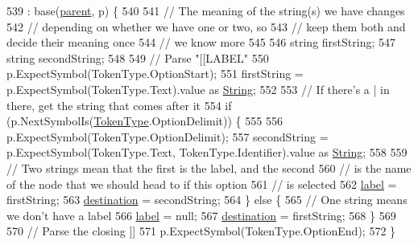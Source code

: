 \begin{DoxyCode}
539                                                                  : base(\hyperlink{a00122_af313a82103fcc2ff5a177dbb06b92f7b}{parent}, p) \{
540 
541                 \textcolor{comment}{// The meaning of the string(s) we have changes}
542                 \textcolor{comment}{// depending on whether we have one or two, so}
543                 \textcolor{comment}{// keep them both and decide their meaning once}
544                 \textcolor{comment}{// we know more}
545 
546                 \textcolor{keywordtype}{string} firstString;
547                 \textcolor{keywordtype}{string} secondString;
548 
549                 \textcolor{comment}{// Parse "[[LABEL"}
550                 p.ExpectSymbol(TokenType.OptionStart);
551                 firstString = p.ExpectSymbol(TokenType.Text).value as \hyperlink{a00031_a301aa7c866593a5b625a8fc158bbeacea27118326006d3829667a400ad23d5d98}{String};
552 
553                 \textcolor{comment}{// If there's a | in there, get the string that comes after it}
554                 \textcolor{keywordflow}{if} (p.NextSymbolIs(\hyperlink{a00031_a301aa7c866593a5b625a8fc158bbeace}{TokenType}.OptionDelimit)) \{
555 
556                     p.ExpectSymbol(TokenType.OptionDelimit);
557                     secondString = p.ExpectSymbol(TokenType.Text, TokenType.Identifier).value as 
      \hyperlink{a00031_a301aa7c866593a5b625a8fc158bbeacea27118326006d3829667a400ad23d5d98}{String};
558 
559                     \textcolor{comment}{// Two strings mean that the first is the label, and the second}
560                     \textcolor{comment}{// is the name of the node that we should head to if this option}
561                     \textcolor{comment}{// is selected}
562                     \hyperlink{a00120_a7f27d78e67fed6992767e995e70fc468}{label} = firstString;
563                     \hyperlink{a00120_abbe56fba06169901508e6c659f06c236}{destination} = secondString;
564                 \} \textcolor{keywordflow}{else} \{
565                     \textcolor{comment}{// One string means we don't have a label}
566                     \hyperlink{a00120_a7f27d78e67fed6992767e995e70fc468}{label} = null;
567                     \hyperlink{a00120_abbe56fba06169901508e6c659f06c236}{destination} = firstString;
568                 \}
569 
570                 \textcolor{comment}{// Parse the closing ]]}
571                 p.ExpectSymbol(TokenType.OptionEnd);
572             \}
\end{DoxyCode}


